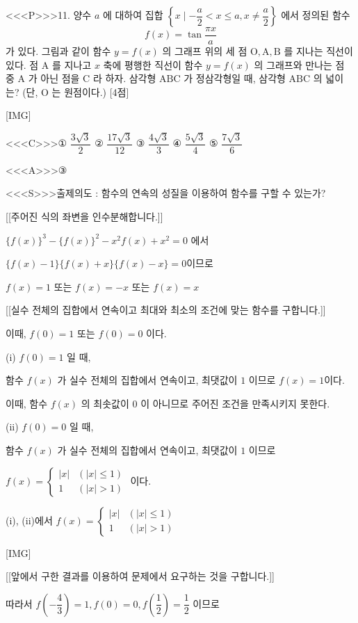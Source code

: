 \documentclass{oblivoir}
\begin{document}
<<<P>>>11. 양수 $a$ 에 대하여 집합 $\left\{x \mid-\dfrac{a}{2}< x \leq a, x \neq \dfrac{a}{2}\right\}$ 에서 정의된 함수
$$
f(x)=\tan \dfrac{\pi x}{a}
$$
가 있다. 그림과 같이 함수 $y=f(x)$ 의 그래프 위의 세 점 $\mathrm{O}, \mathrm{A}, \mathrm{B}$ 를 지나는 직선이 있다. 점 $\mathrm{A}$ 를 지나고 $x$ 축에 평행한 직선이 함수 $y=f(x)$ 의 그래프와 만나는 점 중 $\mathrm{A}$ 가 아닌 점을 $\mathrm{C}$ 라 하자. 삼각형 $\mathrm{ABC}$ 가 정삼각형일 때, 삼각형 $\mathrm{ABC}$ 의 넓이는? (단, $\mathrm{O}$ 는 원점이다.) [4점]

[IMG]

<<<C>>>① $\dfrac{3 \sqrt{3}}{2}$
② $\dfrac{17 \sqrt{3}}{12}$
③ $\dfrac{4 \sqrt{3}}{3}$
④ $\dfrac{5 \sqrt{3}}{4}$
⑤ $\dfrac{7 \sqrt{3}}{6}$


<<<A>>>③

<<<S>>>출제의도 : 함수의 연속의 성질을 이용하여 함수를 구할 수 있는가?

[[주어진 식의 좌변을 인수분해합니다.]]

$\{f(x)\}^{3}-\{f(x)\}^{2}-x^{2} f(x)+x^{2}=0$ 에서

$\{f(x)-1\}\{f(x)+x\}\{f(x)-x\}=0$이므로

$f(x)=1$ 또는 $f(x)=-x$ 또는 $f(x)=x$

[[실수 전체의 집합에서 연속이고 최대와 최소의 조건에 맞는 함수를 구합니다.]]

이때, $f(0)=1$ 또는 $f(0)=0$ 이다.

(i) $f(0)=1$ 일 때,

함수 $f(x)$ 가 실수 전체의 집합에서 연속이고, 최댓값이 $1$ 이므로 $f(x)=1$이다.

이때, 함수 $f(x)$ 의 최솟값이 $0$ 이 아니므로 주어진 조건을 만족시키지 못한다.

(ii) $f(0)=0$ 일 때,

함수 $f(x)$ 가 실수 전체의 집합에서 연속이고, 최댓값이 $1$ 이므로

$f(x)=\begin{cases}|x| & (|x| \leq 1) \\ 1 & (|x|>1) \end{cases}$
이다.

(i), (ii)에서 $f(x)=\begin{cases} |x| & (|x| \leq 1) \\ 1 & (|x|>1)\end{cases}$

[IMG]

[[앞에서 구한 결과를 이용하여 문제에서 요구하는 것을 구합니다.]]

따라서 $f\left(-\dfrac{4}{3}\right)=1, f(0)=0, f\left(\dfrac{1}{2}\right)=\dfrac{1}{2}$ 이므로
\end{document}
